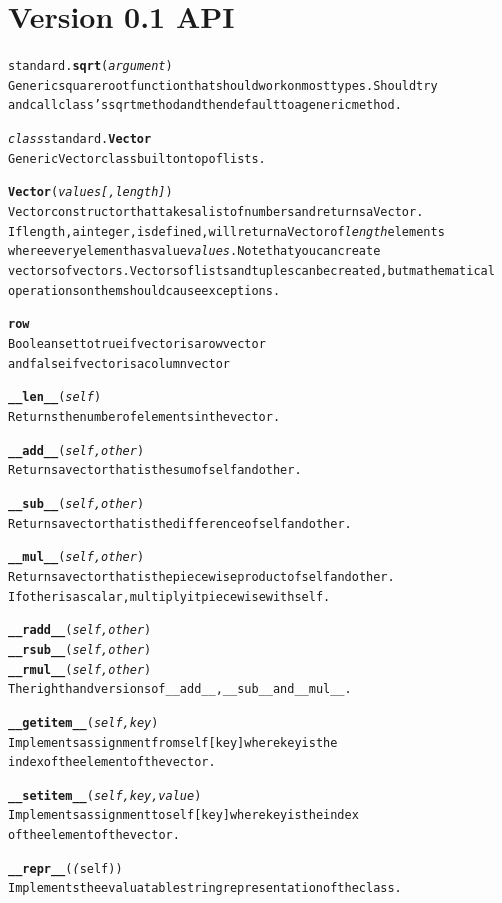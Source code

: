 \documentclass{book}
\begin{document}
\section{Version 0.1 API}
\begin{alltt}
standard.\textbf{sqrt}(\emph{ argument} )
    Generic square root function that should work on most types. Should try 
    and call class's sqrt method and then default to a generic method.

\emph{class} standard.\textbf{Vector }
    Generic Vector class built on top of lists.

    \textbf{Vector}( \emph{ values [,length] } )
       Vector constructor that takes a list of numbers and returns a Vector.
       If length, a integer, is defined, will return a Vector of \emph{length} elements
       where every element has value \emph{values}. Note that you can create
       vectors of vectors. Vectors of lists and tuples can be created, but mathematical
       operations on them should cause exceptions.

    \textbf{row}
        Boolean set to true if vector is a row vector 
        and false if vector is a column vector

   \textbf{__len__}(\emph{self})
        Returns the number of elements in the vector.

    \textbf{__add__}( \emph{ self, other} )
         Returns a vector that is the sum of self and other.

    \textbf{__sub__}( \emph{ self, other} )
         Returns a vector that is the difference of self and other.

    \textbf{__mul__}( \emph{ self, other} )
         Returns a vector that is the piecewise product of self and other.
         If other is a scalar, multiply it piecewise with self.

    \textbf{__radd__}( \emph{ self, other} )
    \textbf{__rsub__}( \emph{ self, other} )
    \textbf{__rmul__}( \emph{ self, other} )
        The right hand versions of __add__, __sub__ and __mul__.

    \textbf{__getitem__}( \emph{ self, key} )
        Implements assignment from self[key] where key is the 
        index of the element of the vector.

    \textbf{__setitem__}( \emph{ self, key, value} )
        Implements assignment to self[key] where key is the index 
        of the element of the vector.

  \textbf{__repr__}(\emph(self) )
    Implements the evaluatable string representation of the class.


\end{alltt}
\end{document}
